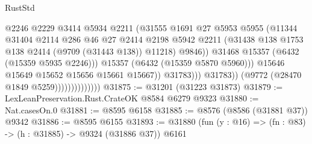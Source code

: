 \begin{lexlean}{RustStd}
\begin{coremodule}
                                              @2246
                                              @2229
                                              @3414
                                              @5934
                                              @2211
                                              (@31555
                                                @1691
                                                @27
                                                @5953
                                                @5955
                                                (@11344
                                                  @31404
                                                  @2114
                                                  @286
                                                  @46
                                                  @27
                                                  @2414
                                                  @2198
                                                  @5942
                                                  @2211
                                                  (@31438
                                                    @138
                                                    @1753
                                                    @138
                                                    @2414
                                                    (@9709 (@31443 @138))
                                                    @11218)
                                                  @9846))
                                              @31468
                                              @15357
                                              (@6432 (@15359 @5935 @2246)))
                                            @15357
                                            (@6432 (@15359 @5870 @5960)))
                                          @15646
                                          @15649
                                          @15652
                                          @15656
                                          @15661
                                          @15667))
                                      @31783)))
                                @31783))
                            (@9772 (@28470 @1849 @5259))))))))))))))
@31875 := @31201 (@31223 @31873)
@31879 := LexLeanPreservation.Rust.CrateOK @8584 @6279 @9323
@31880 := Nat.casesOn.{0}
@31881 := @8595 @6158
@31885 := @8576 (@8586 (@31881 @37)) @9342
@31886 := @8595 @6155
@31893 := @31880 (fun (y : @16) => (fn : @83) -> (h : @31885) -> @9324 (@31886 @37)) @6161

\end{coremodule}
\end{lexlean}
